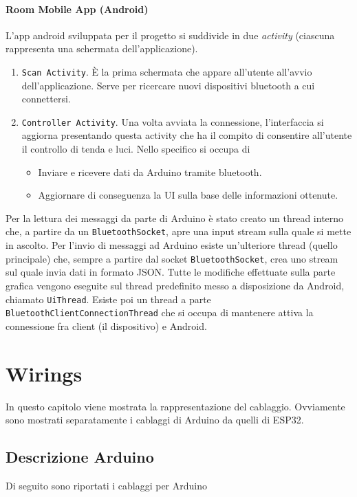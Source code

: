 \documentclass[a4paper,12pt]{report}
\begin{document}
\subsubsection{Room Mobile App (Android)}
L'app android sviluppata per il progetto si suddivide in due \emph{activity} (ciascuna rappresenta una schermata dell'applicazione).
\begin{enumerate}
    \item \texttt{Scan Activity}. È la prima schermata che appare all'utente all'avvio dell'applicazione. Serve per ricercare nuovi dispositivi bluetooth a cui connettersi.
    \item \texttt{Controller Activity}. Una volta avviata la connessione, l'interfaccia si aggiorna presentando questa activity che ha il compito di consentire all'utente il controllo di tenda e luci. Nello specifico si occupa di
    \begin{itemize}
        \item Inviare e ricevere dati da Arduino tramite bluetooth.
        \item Aggiornare di conseguenza la UI sulla base delle informazioni ottenute.
    \end{itemize}
\end{enumerate}
Per la lettura dei messaggi da parte di Arduino è stato creato un thread interno che, a partire da un \texttt{BluetoothSocket}, apre una input stream sulla quale si mette in ascolto. 
Per l'invio di messaggi ad Arduino esiste un'ulteriore thread (quello principale) che, sempre a partire dal socket \texttt{BluetoothSocket}, crea uno stream sul quale invia dati in formato JSON.
Tutte le modifiche effettuate sulla parte grafica vengono eseguite sul thread predefinito messo a disposizione da Android, chiamato \texttt{UiThread}.
Esiste poi un thread a parte \texttt{BluetoothClientConnectionThread} che si occupa di mantenere attiva la connessione fra client (il dispositivo) e Android.


\chapter{Wirings}
In questo capitolo viene mostrata la rappresentazione del cablaggio.
Ovviamente sono mostrati separatamente i cablaggi di Arduino da quelli di ESP32.
\section{Descrizione Arduino}
Di seguito sono riportati i cablaggi per Arduino
\end{document}
